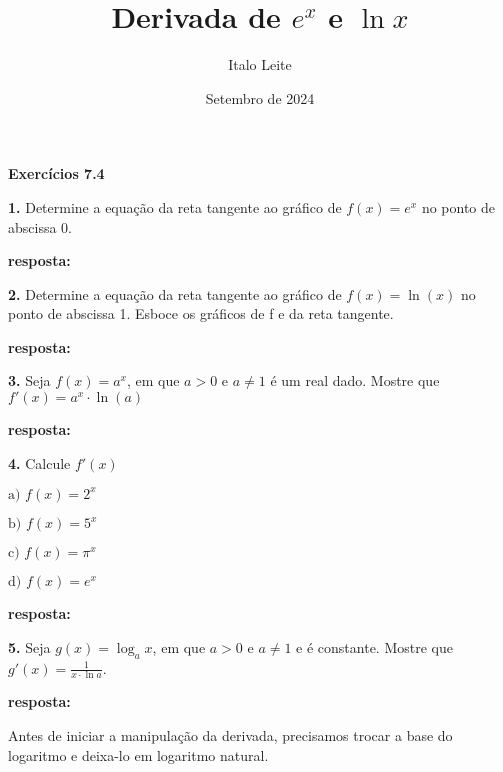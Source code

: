 \documentclass[article,12pt,oneside,a4paper,brazil]{abntex2}
\title{Derivada de $e^x$ e $\ln{x}$}
\author{Italo Leite}
\date{Setembro de 2024}
\begin{document}
	
	
	
	\begin{flushleft}
		\textbf{Exercícios 7.4}
		
		\textbf{1.} Determine a equação da reta tangente ao gráfico de $f(x) = e^x$ no ponto de abscissa 0.
		
		\textbf{resposta:}
		
		
		\vspace{1em}
		
		\textbf{2.} Determine a equação da reta tangente ao gráfico de $f(x) = \ln(x)$ no ponto de abscissa 1. Esboce os gráficos de f e da reta tangente.
		
		\textbf{resposta:}
		
		
		\vspace{1em}
		
		\textbf{3.} Seja $f(x) = a^x$, em que $a > 0$ e $a \neq 1$ é um real dado. Mostre que $f'(x)
		= a^x \cdot \ln(a)$	
		
		\textbf{resposta:}
		
		
		\vspace{1em}
		
		\textbf{4.} Calcule $f'(x)$	
			
		\begin{adjustwidth}{0.5cm}{0cm}
			$\text{a) } f(x) = 2^x$
			
			$\text{b) } f(x) = 5^x$
		
			$\text{c) } f(x) = \pi^x$
			
			$\text{d) } f(x) = e^x$
		\end{adjustwidth}	
			
		\textbf{resposta:}
		
		
		\vspace{1em}
		
		\textbf{5.} Seja $g(x)=\log_{a}{x}$, em que $a > 0$ e $a \neq 1$ e é constante. Mostre que $g'(x)=\frac{1}{x \cdot \ln{a}}$.
		
		\textbf{resposta:}
		
		Antes de iniciar a manipulação da derivada, precisamos trocar a base do logaritmo e deixa-lo em logaritmo natural.
		

\end{flushleft}
\end{document}
